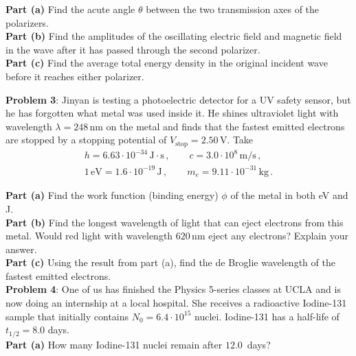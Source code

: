 \documentclass[11pt]{article}
\begin{document}
\noindent\textbf{Part (a)} Find the acute angle $\theta$ between the two transmission axes of the polarizers.\\

\noindent\textbf{Part (b)} Find the amplitudes of the oscillating electric field and magnetic field in the wave after it has passed through the second polarizer.\\

\noindent\textbf{Part (c)} Find the average total energy density in the original incident wave before it reaches either polarizer.

\newpage
\noindent\textbf{Problem 3}: Jinyan is testing a photoelectric detector for a UV safety sensor, but he has forgotten what metal was used inside it. He shines ultraviolet light with wavelength $\lambda=248\,$nm on the metal and finds that the fastest emitted electrons are stopped by a stopping potential of $V_{\text{stop}}=2.50\,$V. Take
\begin{align*}
h=6.63\cdot 10^{-34}\,\text{J}\cdot\text{s}\,,\qquad
c=3.0\cdot 10^8\,\text{m/s}\,,\\
1\,\text{eV}=1.6\cdot 10^{-19}\,\text{J}\,,\qquad
m_e=9.11\cdot 10^{-31}\,\text{kg}\,.
\end{align*}

\noindent\textbf{Part (a)} Find the work function (binding energy) $\phi$ of the metal in both eV and J.\\

\noindent\textbf{Part (b)} Find the longest wavelength of light that can eject electrons from this metal. Would red light with wavelength $620\,$nm eject any electrons? Explain your answer.\\

\noindent\textbf{Part (c)} Using the result from part (a), find the de Broglie wavelength of the fastest emitted electrons.\\

\hfill\break
\hfill\break
\hfill\break
\hfill\break
\hfill\break
\hfill\break
\hfill\break
\hfill\break
\hfill\break
\hfill\break
\noindent\textbf{Problem 4}: One of us has finished the Physics 5-series classes at UCLA and is now doing an internship at a local hospital. She receives a radioactive Iodine-131 sample that initially contains $N_0=6.4\cdot 10^{15}$ nuclei. Iodine-131 has a half-life of $t_{1/2}=8.0$ days.\\

\noindent\textbf{Part (a)} How many Iodine-131 nuclei remain after $12.0\,$ days?\\
\end{document}

